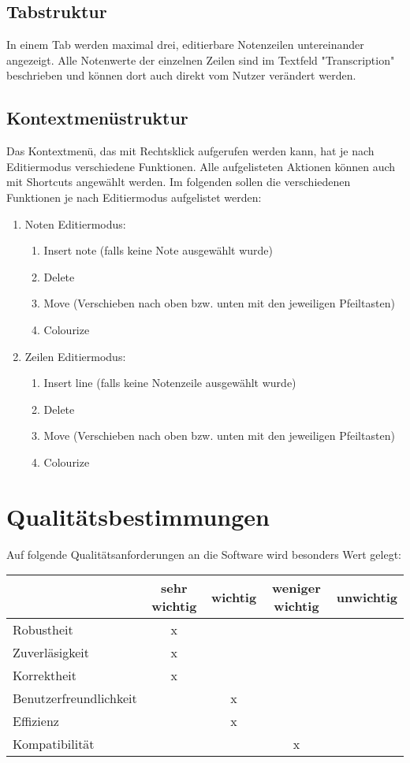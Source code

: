 \documentclass[10pt, paper = a4, oneside,final]{article}
\begin{document}
\subsection{Tabstruktur}
In einem Tab werden maximal drei, editierbare Notenzeilen untereinander angezeigt. Alle Notenwerte der einzelnen Zeilen sind im Textfeld "Transcription" beschrieben und können dort auch direkt vom Nutzer verändert werden.

\subsection{Kontextmenüstruktur}
Das Kontextmenü, das mit Rechtsklick aufgerufen werden kann, hat je nach Editiermodus verschiedene Funktionen. Alle aufgelisteten Aktionen können auch mit Shortcuts angewählt werden. Im folgenden sollen die verschiedenen Funktionen je nach Editiermodus aufgelistet werden:
\begin{enumerate}[label=$\circ$]
	\item Noten Editiermodus:
	\begin{enumerate}[label=$\circ$]
		\item Insert note (falls keine Note ausgewählt wurde)
		\item Delete
		\item Move (Verschieben nach oben bzw. unten mit den jeweiligen Pfeiltasten)
		\item Colourize
	\end{enumerate}
	\item Zeilen Editiermodus:
	\begin{enumerate}[label=$\circ$]
		\item Insert line (falls keine Notenzeile ausgewählt wurde)
		\item Delete
		\item Move (Verschieben nach oben bzw. unten mit den jeweiligen Pfeiltasten)
		\item Colourize
	\end{enumerate}
\end{enumerate}

\section{Qualitätsbestimmungen}
Auf folgende Qualitätsanforderungen an die Software wird besonders Wert gelegt:
\begin{center}
	\begin{tabular}{l||c|c|c|c}
		~ & sehr wichtig & wichtig & weniger wichtig & unwichtig \\
		\hline \hline
		Robustheit & x& & & \\ \hline
		Zuverläsigkeit & x& & & \\ \hline
		Korrektheit & x& & & \\ \hline
		Benutzerfreundlichkeit & & x& & \\ \hline
		Effizienz & & x& & \\ \hline
		Kompatibilität & & & x& 
	\end{tabular}
\end{center}
\end{document}
